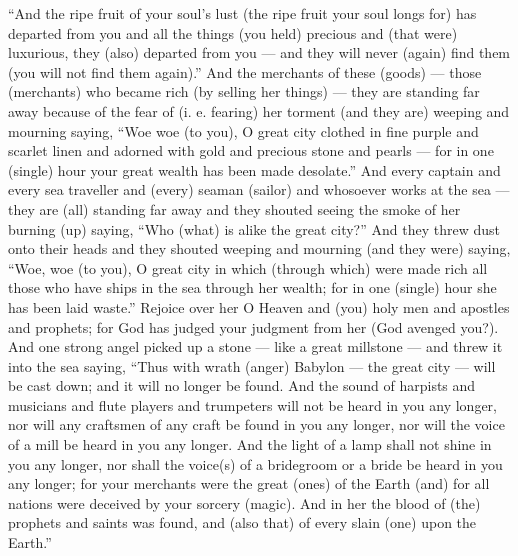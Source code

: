 \begin{pages}
\begin{Leftside}
		\pend
		\pstart
		“And the ripe fruit of your soul’s lust (the ripe fruit your soul longs for) has departed from you and all the things (you held) precious and (that were) luxurious, they (also) departed from you — and they will never (again) find them (you will not find them again).” 
		\pend
		\pstart
		And the merchants of these (goods) — those (merchants) who became rich (by selling her things) — they are standing far away because of the fear of (i. e. fearing) her torment (and they are) weeping and mourning saying, “Woe woe (to you), O great city clothed in fine purple and scarlet linen and adorned with gold and precious stone and pearls — for in one (single) hour your great wealth has been made desolate.”
		\pend
		\pstart
		And every captain and every sea traveller and (every) seaman (sailor) and whosoever works at the sea — they are (all) standing far away and they shouted seeing the smoke of her burning (up) saying, “Who (what) is alike the great city?” And they threw dust onto their heads and they shouted weeping and mourning (and they were) saying, “Woe, woe (to you), O great city in which (through which) were made rich all those who have ships in the sea through her wealth; for in one (single) hour she has been laid waste.” Rejoice over her O Heaven and (you) holy men and apostles and prophets; for God has judged your judgment from her (God avenged you?). 
		\pend
		\pstart
		And one strong angel picked up a stone — like a great millstone — and threw it into the sea saying, “Thus with wrath (anger) Babylon — the great city — will be cast down; and it will no longer be found. And the sound of harpists and musicians and flute players and trumpeters will not be heard in you any longer, nor will any craftsmen of any craft be found in you any longer, nor will the voice of a mill be heard in you any longer. And the light of a lamp shall not shine in you any longer, nor shall the voice(s) of a bridegroom or a bride be heard in you any longer; for your merchants were the great (ones) of the Earth (and) for all nations were deceived by your sorcery (magic). And in her the blood of (the) prophets and saints was found, and (also that) of every slain (one) upon the Earth.” 
		\pend
        \endnumbering
    \end{Leftside}

\end{pages} 
\Pages

